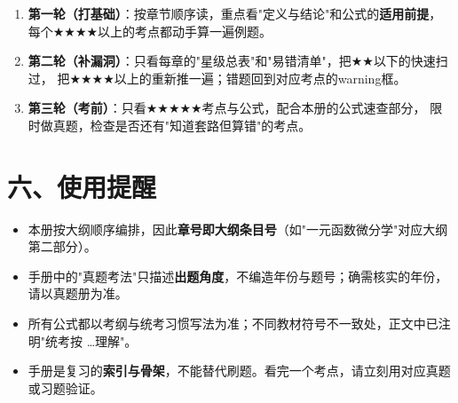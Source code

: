 \begin{enumerate}
  \item \textbf{第一轮（打基础）}：按章节顺序读，重点看"定义与结论"和公式的\textbf{适用前提}，
        每个$\bigstar\bigstar\bigstar\bigstar$以上的考点都动手算一遍例题。
  \item \textbf{第二轮（补漏洞）}：只看每章的"星级总表"和"易错清单"，把$\bigstar\bigstar$以下的快速扫过，
        把$\bigstar\bigstar\bigstar\bigstar$以上的重新推一遍；错题回到对应考点的warning框。
  \item \textbf{第三轮（考前）}：只看$\bigstar\bigstar\bigstar\bigstar\bigstar$考点与公式，配合本册的公式速查部分，
        限时做真题，检查是否还有"知道套路但算错"的考点。
\end{enumerate}

\section*{六、使用提醒}

\begin{itemize}
  \item 本册按大纲顺序编排，因此\textbf{章号即大纲条目号}（如"一元函数微分学"对应大纲第二部分）。
  \item 手册中的"真题考法"只描述\textbf{出题角度}，不编造年份与题号；确需核实的年份，请以真题册为准。
  \item 所有公式都以考纲与统考习惯写法为准；不同教材符号不一致处，正文中已注明"统考按 \dots 理解"。
  \item 手册是复习的\textbf{索引与骨架}，不能替代刷题。看完一个考点，请立刻用对应真题或习题验证。
\end{itemize}
